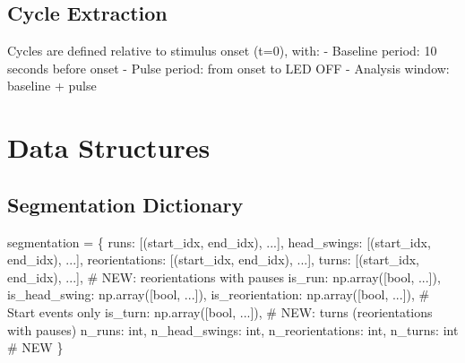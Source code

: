 \documentclass[
  11pt,
]{article}
\newenvironment{Shaded}{\begin{snugshade}}{\end{snugshade}}
\newcommand{\BuiltInTok}[1]{\textcolor[rgb]{0.00,0.23,0.31}{#1}}
\newcommand{\CommentTok}[1]{\textcolor[rgb]{0.37,0.37,0.37}{#1}}
\newcommand{\NormalTok}[1]{\textcolor[rgb]{0.00,0.23,0.31}{#1}}
\newcommand{\OperatorTok}[1]{\textcolor[rgb]{0.37,0.37,0.37}{#1}}
\newcommand{\StringTok}[1]{\textcolor[rgb]{0.13,0.47,0.30}{#1}}
\begin{document}
\hypertarget{cycle-extraction}{%
\subsection{Cycle Extraction}\label{cycle-extraction}}

Cycles are defined relative to stimulus onset (t=0), with: - Baseline
period: 10 seconds before onset - Pulse period: from onset to LED OFF -
Analysis window: baseline + pulse

\hypertarget{data-structures}{%
\section{Data Structures}\label{data-structures}}

\hypertarget{segmentation-dictionary}{%
\subsection{Segmentation Dictionary}\label{segmentation-dictionary}}

\begin{Shaded}
\begin{Highlighting}[]
\NormalTok{segmentation }\OperatorTok{=}\NormalTok{ \{}
    \StringTok{\textquotesingle{}runs\textquotesingle{}}\NormalTok{: [(start\_idx, end\_idx), ...],}
    \StringTok{\textquotesingle{}head\_swings\textquotesingle{}}\NormalTok{: [(start\_idx, end\_idx), ...],}
    \StringTok{\textquotesingle{}reorientations\textquotesingle{}}\NormalTok{: [(start\_idx, end\_idx), ...],}
    \StringTok{\textquotesingle{}turns\textquotesingle{}}\NormalTok{: [(start\_idx, end\_idx), ...],  }\CommentTok{\# NEW: reorientations with pauses}
    \StringTok{\textquotesingle{}is\_run\textquotesingle{}}\NormalTok{: np.array([}\BuiltInTok{bool}\NormalTok{, ...]),}
    \StringTok{\textquotesingle{}is\_head\_swing\textquotesingle{}}\NormalTok{: np.array([}\BuiltInTok{bool}\NormalTok{, ...]),}
    \StringTok{\textquotesingle{}is\_reorientation\textquotesingle{}}\NormalTok{: np.array([}\BuiltInTok{bool}\NormalTok{, ...]),  }\CommentTok{\# Start events only}
    \StringTok{\textquotesingle{}is\_turn\textquotesingle{}}\NormalTok{: np.array([}\BuiltInTok{bool}\NormalTok{, ...]),  }\CommentTok{\# NEW: turns (reorientations with pauses)}
    \StringTok{\textquotesingle{}n\_runs\textquotesingle{}}\NormalTok{: }\BuiltInTok{int}\NormalTok{,}
    \StringTok{\textquotesingle{}n\_head\_swings\textquotesingle{}}\NormalTok{: }\BuiltInTok{int}\NormalTok{,}
    \StringTok{\textquotesingle{}n\_reorientations\textquotesingle{}}\NormalTok{: }\BuiltInTok{int}\NormalTok{,}
    \StringTok{\textquotesingle{}n\_turns\textquotesingle{}}\NormalTok{: }\BuiltInTok{int}  \CommentTok{\# NEW}
\NormalTok{\}}
\end{Highlighting}
\end{Shaded}
\end{document}

